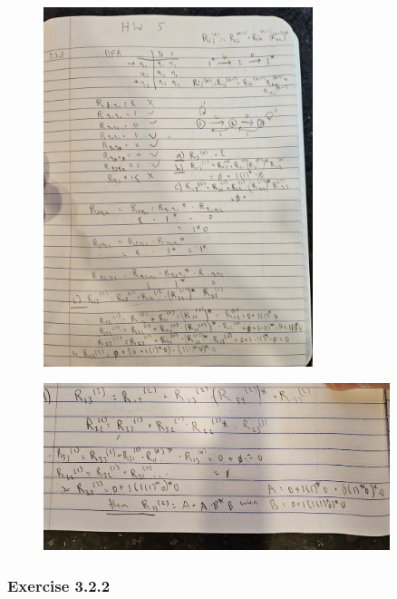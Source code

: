\documentclass{article}
\theoremstyle{theorem}
\theoremstyle{definition}
\theoremstyle{remark}
\begin{document}
\begin{figure}[H]
    \centering
    \includegraphics[angle=-90, width=0.7\textwidth]{latexImages/hw5-3.2.1.jpg} 
\end{figure}

\begin{figure}[H]
    \centering
    \includegraphics[angle=0, width=0.9\textwidth]{latexImages/hw5-3.2.1-d.jpg} 
\end{figure}

\subsubsection{Exercise 3.2.2}
\end{document}
